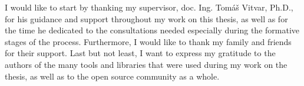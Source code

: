 I would like to start by thanking my supervisor, doc. Ing. Tomáš Vitvar, Ph.D., for his guidance and support throughout my work on this thesis, as well as for the time he dedicated to the consultations needed especially during the formative stages of the process. Furthermore, I would like to thank my family and friends for their support. Last but not least, I want to express my gratitude to the authors of the many tools and libraries that were used during my work on the thesis, as well as to the open source community as a whole.
